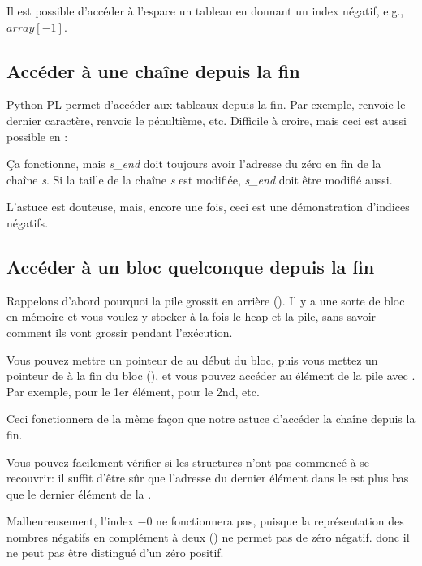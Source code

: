 \label{negative_array_indices}

Il est possible d'accéder à l'espace  un tableau en donnant un index négatif,
e.g., $array[-1]$.

\subsection{Accéder à une chaîne depuis la fin}

Python \ac{PL} permet d'accéder aux tableaux depuis la fin.
Par exemple,  renvoie le dernier caractère,  renvoie
le pénultième, etc.
Difficile à croire, mais ceci est aussi possible en \CCpp:



Ça fonctionne, mais \textit{s\_end} doit toujours avoir l'adresse du zéro en fin
de la chaîne \textit{s}. Si la taille de la chaîne \textit{s} est modifiée,
\textit{s\_end} doit être modifié aussi.

L'astuce est douteuse, mais, encore une fois, ceci est une démonstration d'indices
négatifs.

\subsection{Accéder à un bloc quelconque depuis la fin}

Rappelons d'abord pourquoi la pile grossit en arrière ().
Il y a une sorte de bloc en mémoire et vous voulez y stocker à la fois le heap et
la pile, sans savoir comment ils vont grossir pendant l'exécution.

Vous pouvez mettre un pointeur de  au début du bloc, puis vous mettez un
pointeur de  à la fin du bloc (), et vous pouvez
accéder au  élément de la pile avec .
Par exemple,  pour le 1er élément,  pour le 2nd, etc.

Ceci fonctionnera de la même façon que notre astuce d'accéder la chaîne depuis la
fin.

Vous pouvez facilement vérifier si les structures n'ont pas commencé à se recouvrir:
il suffit d'être sûr que l'adresse du dernier élément dans le  est plus
bas que le dernier élément de la .

Malheureusement, l'index  $-0$ ne fonctionnera pas, puisque la représentation des
nombres négatifs en complément à deux () ne permet pas de
zéro négatif. donc il ne peut pas être distingué d'un zéro positif.

